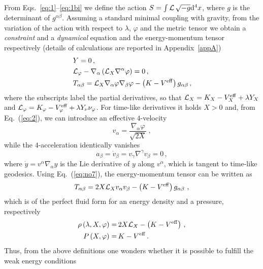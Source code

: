 \documentclass[twocolumn,showpacs, nofootinbib,aps,superscriptaddress, eqsecnum,prd,prl,notitlepage,showkeys,10pt,reprint]{revtex4-1}
\begin{document}
From Eqs.~\eqref{eq:1}--\eqref{eq:1bi} we define the action $
S = \int \mathcal{L}\,\sqrt{-g}{\rm d}^4x$, where $g$ is the determinant of $g^{\alpha\beta}$.
Assuming a standard minimal coupling with gravity, from the variation of the action with respect to $\lambda$, $\varphi$ and the metric tensor we obtain a \textit{constraint} and a \textit{dynamical} equation and the energy-momentum tensor respectively (details of calculations are reported in Appendix~\ref{appA})
%
\begin{align}
\label{eq:no5a}
&\,Y = 0\,, \\
\label{eq:no5b}
&\,\mathcal{L}_\varphi - \nabla_\alpha \left( \mathcal{L}_X \nabla^\alpha\varphi \right) = 0\,,\\
\label{eq:no6}
&\, T_{\alpha\beta}  = \mathcal{L}_X \nabla_\alpha\varphi \nabla_\beta \varphi - \left(K -  V^{\rm eff} \right) g_{\alpha\beta}\,,
\end{align}
%
where the subscripts label the partial derivatives, so that $\mathcal{L}_X=K_X-V^{\rm eff}_X+\lambda Y_X$ and $\mathcal{L}_\varphi = K_\varphi-V^{\rm eff}_\varphi+\lambda Y_\nu \nu_\varphi$.
For time-like derivatives it holds $X>0$ and, from Eq.~(\ref{eq:2}), we can introduce an effective $4$-velocity
%
\begin{equation}
\label{eq:no7}
v_\alpha = \frac{\nabla_\alpha\varphi}{\sqrt{2X}}\ ,
\end{equation}
%
while the $4$-acceleration identically vanishes
%
\begin{equation}
\label{eq:no8}
a_\beta = \dot{v}_\beta = v_\gamma \nabla^\gamma v_\beta = 0\,,
\end{equation}
%
where $\dot{y}=v^\alpha\nabla_\alpha y$ is the Lie derivative of $y$ along $v^\alpha$, which is tangent to time-like geodesics.
Using Eq.~(\ref{eq:no7}), the energy-momentum tensor can be written as
%
\begin{equation}
\label{eq:no10}
T_{\alpha\beta} = 2X \mathcal{L}_X v_\alpha v_\beta - \left(K -  V^{\rm eff} \right) g_{\alpha\beta}\ ,
\end{equation}
%
which is of the perfect fluid form for an energy density and a pressure, respectively
%
\begin{align}
\label{eq:no11}
\rho\left(\lambda,X,\varphi\right) =\,& 2X \mathcal{L}_X - \left(K -  V^{\rm eff} \right)\,,\\
\label{eq:no12}
P\left(X,\varphi\right) =\,& K - V^{\rm eff}\,.
\end{align}
%
Thus, from the above definitions one wonders whether it is possible to fulfill the weak energy conditions
\end{document}

